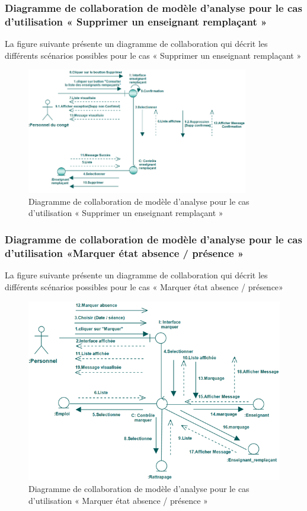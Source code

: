 \documentclass[12 pt ]{report}
\begin{document}
\subsubsection{Diagramme  de  collaboration  de  modèle  d'analyse  pour  le  cas  d'utilisation « Supprimer un enseignant remplaçant »   }
La figure suivante présente un diagramme de collaboration qui décrit les différents
scénarios possibles pour le cas « Supprimer un enseignant remplaçant »  
\begin{figure}[h]
\begin{center}
\includegraphics[width= 12 cm , height =5.5cm]{colla_sup_rem.PNG}
 \caption{Diagramme  de  collaboration  de  modèle  d'analyse  pour  le  cas  d'utilisation « Supprimer un enseignant remplaçant »  }
\end{center}
\end{figure}
\subsubsection{Diagramme  de  collaboration  de  modèle  d'analyse  pour  le  cas  d'utilisation «Marquer état absence /   présence »   }
La figure suivante présente un diagramme de collaboration qui décrit les différents
scénarios possibles pour le cas « Marquer état absence / présence»  
\begin{figure}[h]
\begin{center}
\includegraphics[width= 14 cm , height =8cm]{col_mar_abs.PNG}
 \caption{Diagramme  de  collaboration  de  modèle  d'analyse  pour  le  cas  d'utilisation « Marquer état absence /   présence »  }
\end{center}
\end{figure}
\end{document}
